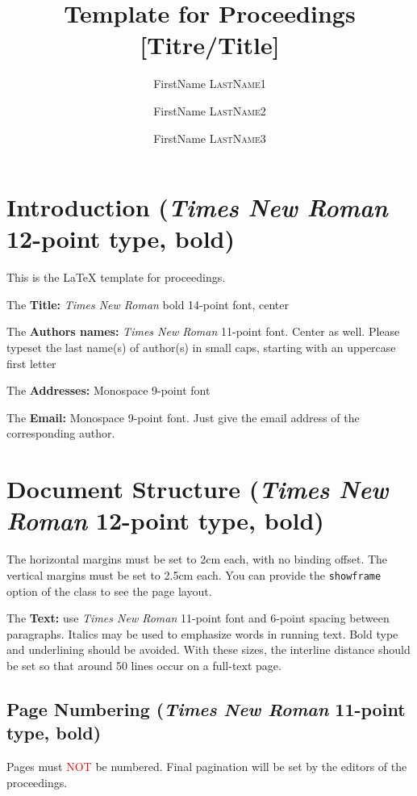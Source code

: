 \documentclass[long, final]{jobim2017}
\title{Template for \jobim2017 Proceedings [Titre/Title]}
\author{FirstName \textsc{LastName1}\inst{1} \and FirstName \textsc{LastName2}\inst{2} \and FirstName \textsc{LastName3}\inst{2}}
\institute{
 Laboratory, Address, zip code, Town, Country
}
\begin{document}

   \maketitle

 \section{Introduction (\emph{Times New Roman} 12-point type, bold)}
 \label{sec:introduction}

This is the {\LaTeX} template for  proceedings.

The \textbf{Title:} \emph{Times New Roman} bold 14-point font, center

The \textbf{Authors names:} \emph{Times New Roman} 11-point font. Center as
well. Please typeset the last name(s) of author(s) in small caps, starting
with an uppercase first letter

The \textbf{Addresses:} Monospace 9-point font

The \textbf{Email:} Monospace 9-point font. Just give the email address of the corresponding author.

\section{Document Structure (\emph{Times New Roman} 12-point type, bold)}
\label{sec:doc-struct}

The horizontal margins must be set to 2cm each, with no binding offset. The
vertical margins must be set to 2.5cm each. You can provide the
\verb+showframe+ option of the \LaTeXe\space class to see the page layout.

The \textbf{Text:} use \emph{Times New Roman} 11-point font and 6-point spacing between paragraphs.
Italics may be used to emphasize words in running text. Bold type and underlining should be avoided.
With these sizes, the interline distance should be set so that around 50 lines occur on a full-text
page.


\subsection{Page Numbering (\emph{Times New Roman} 11-point type, bold)}
\label{sec:page-numbering}

Pages must \textcolor{red}{NOT} be numbered. Final pagination will be set by
the editors of the proceedings.
\end{document}
